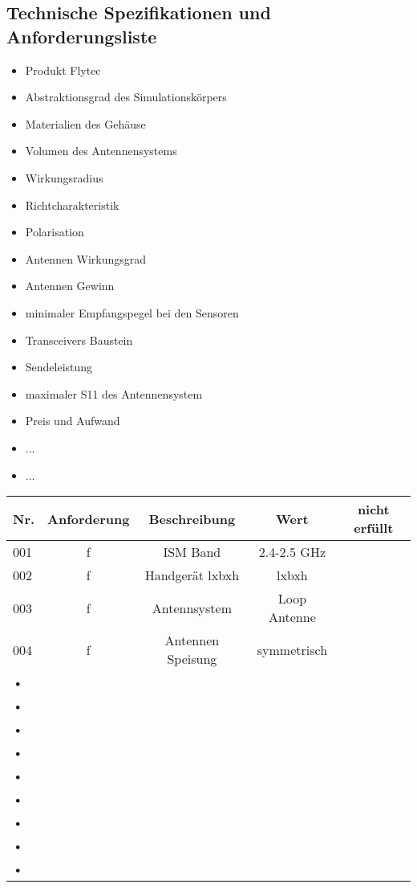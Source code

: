 \subsection{Technische Spezifikationen und Anforderungsliste}
\begin{itemize}
\item Produkt Flytec
\item Abstraktionsgrad des Simulationskörpers
\item Materialien des Gehäuse
\item Volumen des Antennensystems
\item Wirkungsradius
\item Richtcharakteristik
\item Polarisation
\item Antennen Wirkungsgrad
\item Antennen Gewinn
\item minimaler Empfangspegel bei den Sensoren
\item Transceivers Baustein
\item Sendeleistung
\item maximaler S11 des Antennensystem
\item Preis und Aufwand
\item ...
\item ...


\end{itemize}
\begin{tabular}{l|c|c|c|c}
\hline 
Nr. & Anforderung & Beschreibung & Wert & nicht erfüllt \\ 
\hline 
\hline 
001 & f & ISM Band  & 2.4-2.5 GHz & \\ 
\hline 
002 & f & Handgerät lxbxh & lxbxh &   \\ 
\hline 
003 & f & Antennsystem & Loop Antenne &  \\ 
\hline 
004 & f & Antennen Speisung  & symmetrisch &  \\ 
\hline 
• &  &  &  &  \\ 
\hline 
• &  &  &  &  \\ 
\hline 
• &  &  &  &  \\ 
\hline 
• &  &  &  &  \\
\hline 
• &  &  &  &  \\ 
\hline 
• &  &  &  &  \\ 
\hline 
• &  &  &  &  \\ 
\hline
• &  &  &  &  \\ 
\hline 
• &  &  &  &  \\
\hline 
\end{tabular} 
